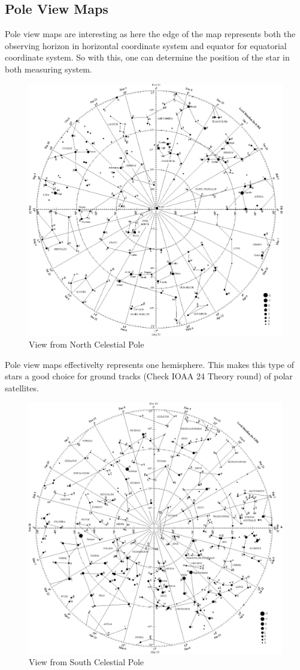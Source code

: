 \documentclass[a4paper,12pt]{extarticle}
\begin{document}
\subsection{Pole View Maps}
Pole view maps are interesting as here the edge of the map represents both the observing horizon in horizontal coordinate system and equator for equatorial coordinate system. So with this, one can determine the position of the star in both measuring system. \\
\begin{figure}[H]
    \centering
    \includegraphics[width=0.9 \linewidth]{ncp_view.eps}
    \caption{View from North Celestial Pole}
\end{figure}
Pole view maps effectivelty represents one hemisphere. This makes this type of stars a good choice for ground tracks (Check IOAA 24 Theory round) of polar satellites.

\begin{figure}[H]
    \centering
    \includegraphics[width=0.9 \linewidth]{scp_view.eps}
    \caption{View from South Celestial Pole}
\end{figure}
\end{document}
